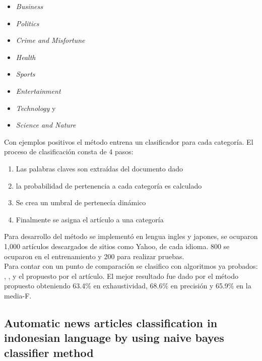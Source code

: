 \begin{itemize}

	\item \textit{Business} 
	\item \textit{Politics} 
	\item \textit{Crime and Misfortune} 
	\item \textit{Health} 
	\item \textit{Sports} 
	\item \textit{Entertainment} 
	\item \textit{Technology} y 
	\item \textit{Science and Nature}

\end{itemize}



Con ejemplos positivos el método entrena un clasificador para cada categoría.
El proceso de clasificación consta de 4 pasos:

\begin{enumerate}
	\item Las palabras claves son extraídas del documento dado
	\item la probabilidad de pertenencia a cada categoría es calculado
	\item Se crea un umbral de pertenecía dinámico
	\item Finalmente se asigna el artículo a una categoría
\end{enumerate}

Para desarrollo del método se implementó en lengua ingles y japones, se ocuparon 1,000 artículos descargados de sitios como Yahoo, de cada idioma. 800 se ocuparon en el entrenamiento y 200 para realizar pruebas. \\

Para contar con un punto de comparación se clasifico con algoritmos  ya probados: , ,  y el propuesto por el artículo. El mejor resultado fue dado por  el método propuesto obteniendo 63.4\% en exhaustividad, 68.6\% en precisión y 65.9\% en la media-F.\\ 



\begin{large}
	 \subsection[Automatic news articles classification in indonesian]{Automatic news articles classification in indonesian language by using naive bayes classifier method}
\end{large}

